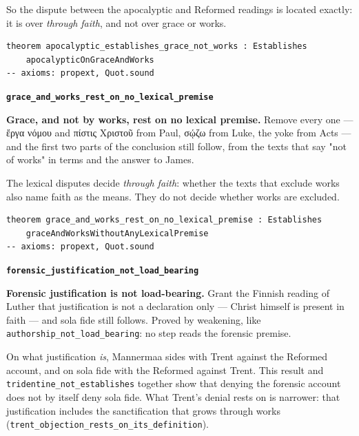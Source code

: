 \documentclass[11pt]{article}
\begin{document}
So the dispute between the apocalyptic and Reformed readings is located exactly: it is over \emph{through faith}, and not over grace or works.

{\small\begin{verbatim}
theorem apocalyptic_establishes_grace_not_works : Establishes
    apocalypticOnGraceAndWorks
-- axioms: propext, Quot.sound
\end{verbatim}}
\par\medskip\noindent\textbf{\texttt{grace\_\allowbreak{}and\_\allowbreak{}works\_\allowbreak{}rest\_\allowbreak{}on\_\allowbreak{}no\_\allowbreak{}lexical\_\allowbreak{}premise}}\par\nobreak\noindent
\textbf{Grace, and not by works, rest on no lexical premise.} Remove every one — ἔργα νόμου and πίστις Χριστοῦ from Paul, σῴζω from Luke, the yoke from Acts — and the first two parts of the conclusion still follow, from the texts that say "not of works" in terms and the answer to James.

The lexical disputes decide \emph{through faith}: whether the texts that exclude works also name faith as the means. They do not decide whether works are excluded.

{\small\begin{verbatim}
theorem grace_and_works_rest_on_no_lexical_premise : Establishes
    graceAndWorksWithoutAnyLexicalPremise
-- axioms: propext, Quot.sound
\end{verbatim}}
\par\medskip\noindent\textbf{\texttt{forensic\_\allowbreak{}justification\_\allowbreak{}not\_\allowbreak{}load\_\allowbreak{}bearing}}\par\nobreak\noindent
\textbf{Forensic justification is not load-bearing.} Grant the Finnish reading of Luther that justification is not a declaration only — Christ himself is present in faith — and sola fide still follows. Proved by weakening, like \texttt{authorship\_\allowbreak{}not\_\allowbreak{}load\_\allowbreak{}bearing}: no step reads the forensic premise.

On what justification \emph{is}, Mannermaa sides with Trent against the Reformed account, and on sola fide with the Reformed against Trent. This result and \texttt{tridentine\_\allowbreak{}not\_\allowbreak{}establishes} together show that denying the forensic account does not by itself deny sola fide. What Trent's denial rests on is narrower: that justification includes the sanctification that grows through works (\texttt{trent\_\allowbreak{}objection\_\allowbreak{}rests\_\allowbreak{}on\_\allowbreak{}its\_\allowbreak{}definition}).
\end{document}
